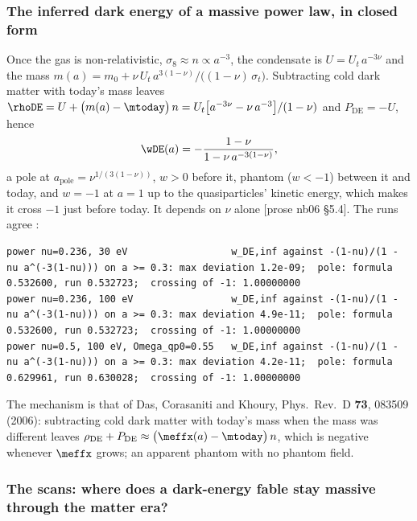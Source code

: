 \subsubsection{The inferred dark energy of a massive power law, in closed form}
\label{sec:4.7.7}

Once the gas is non-relativistic, $\sigma_8\approx n\propto a^{-3}$, the condensate is $U=U_t\,a^{-3\nu}$ and the
mass $m(a)=m_0+\nu\,U_t\,a^{3(1-\nu)}/\bigl((1-\nu)\,\sigma_t\bigr)$. Subtracting cold dark matter with today's
mass leaves $\rhoDE=U+\bigl(m(a)-\mtoday\bigr)\,n=U_t\bigl[a^{-3\nu}-\nu\,a^{-3}\bigr]/(1-\nu)$ and $P_{\mathrm{DE}}=-U$,
hence
\[
  \wDE(a)=-\frac{1-\nu}{1-\nu\,a^{-3(1-\nu)}} ,
\]
a pole at $a_{\mathrm{pole}}=\nu^{1/(3(1-\nu))}$, $w>0$ before it, phantom ($w<-1$) between it and today, and
$w=-1$ at $a=1$ up to the quasiparticles' kinetic energy, which makes it cross $-1$ just before today. It
depends on $\nu$ alone [prose nb06 \S5.4]. The runs agree :
\begin{Verbatim}[fontsize=\scriptsize]
power nu=0.236, 30 eV                  w_DE,inf against -(1-nu)/(1 - nu a^(-3(1-nu))) on a >= 0.3: max deviation 1.2e-09;  pole: formula 0.532600, run 0.532723;  crossing of -1: 1.00000000
power nu=0.236, 100 eV                 w_DE,inf against -(1-nu)/(1 - nu a^(-3(1-nu))) on a >= 0.3: max deviation 4.9e-11;  pole: formula 0.532600, run 0.532723;  crossing of -1: 1.00000000
power nu=0.5, 100 eV, Omega_qp0=0.55   w_DE,inf against -(1-nu)/(1 - nu a^(-3(1-nu))) on a >= 0.3: max deviation 4.2e-11;  pole: formula 0.629961, run 0.630028;  crossing of -1: 1.00000000
\end{Verbatim}
The mechanism is that of Das, Corasaniti and Khoury, Phys.\ Rev.\ D \textbf{73}, 083509 (2006): subtracting
cold dark matter with today's mass when the mass was different leaves
$\rho_{\mathrm{DE}}+P_{\mathrm{DE}}\approx\bigl(\meffx(a)-\mtoday\bigr)\,n$, which is negative whenever $\meffx$
grows; an apparent phantom with no phantom field.

\subsubsection{The scans: where does a dark-energy fable stay massive through the matter era?}
\label{sec:4.7.8}

